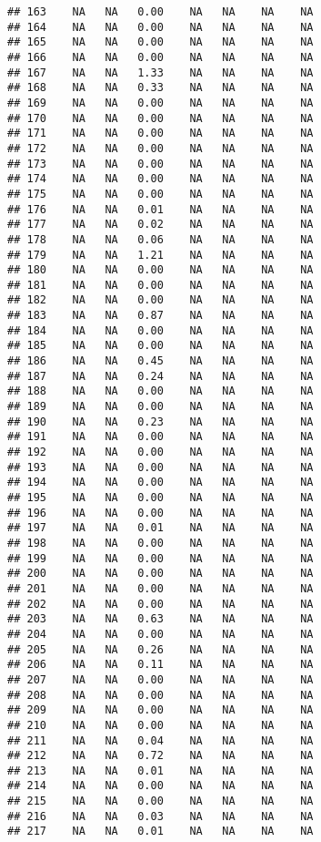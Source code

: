 \documentclass{article}\usepackage{graphicx, color}
\makeatletter
\newenvironment{kframe}{%
 \def\at@end@of@kframe{}%
 \ifinner\ifhmode%
  \def\at@end@of@kframe{\end{minipage}}%
  \begin{minipage}{\columnwidth}%
 \fi\fi%
 \def\FrameCommand##1{\hskip\@totalleftmargin \hskip-\fboxsep
 \colorbox{shadecolor}{##1}\hskip-\fboxsep
     \hskip-\linewidth \hskip-\@totalleftmargin \hskip\columnwidth}%
 \MakeFramed {\advance\hsize-\width
   \@totalleftmargin\z@ \linewidth\hsize
   \@setminipage}}%
 {\par\unskip\endMakeFramed%
 \at@end@of@kframe}
\newenvironment{knitrout}{}{} %
\makeatother
\begin{document}
\begin{knitrout}
\begin{kframe}
\begin{verbatim}
## 163    NA   NA   0.00    NA   NA    NA    NA
## 164    NA   NA   0.00    NA   NA    NA    NA
## 165    NA   NA   0.00    NA   NA    NA    NA
## 166    NA   NA   0.00    NA   NA    NA    NA
## 167    NA   NA   1.33    NA   NA    NA    NA
## 168    NA   NA   0.33    NA   NA    NA    NA
## 169    NA   NA   0.00    NA   NA    NA    NA
## 170    NA   NA   0.00    NA   NA    NA    NA
## 171    NA   NA   0.00    NA   NA    NA    NA
## 172    NA   NA   0.00    NA   NA    NA    NA
## 173    NA   NA   0.00    NA   NA    NA    NA
## 174    NA   NA   0.00    NA   NA    NA    NA
## 175    NA   NA   0.00    NA   NA    NA    NA
## 176    NA   NA   0.01    NA   NA    NA    NA
## 177    NA   NA   0.02    NA   NA    NA    NA
## 178    NA   NA   0.06    NA   NA    NA    NA
## 179    NA   NA   1.21    NA   NA    NA    NA
## 180    NA   NA   0.00    NA   NA    NA    NA
## 181    NA   NA   0.00    NA   NA    NA    NA
## 182    NA   NA   0.00    NA   NA    NA    NA
## 183    NA   NA   0.87    NA   NA    NA    NA
## 184    NA   NA   0.00    NA   NA    NA    NA
## 185    NA   NA   0.00    NA   NA    NA    NA
## 186    NA   NA   0.45    NA   NA    NA    NA
## 187    NA   NA   0.24    NA   NA    NA    NA
## 188    NA   NA   0.00    NA   NA    NA    NA
## 189    NA   NA   0.00    NA   NA    NA    NA
## 190    NA   NA   0.23    NA   NA    NA    NA
## 191    NA   NA   0.00    NA   NA    NA    NA
## 192    NA   NA   0.00    NA   NA    NA    NA
## 193    NA   NA   0.00    NA   NA    NA    NA
## 194    NA   NA   0.00    NA   NA    NA    NA
## 195    NA   NA   0.00    NA   NA    NA    NA
## 196    NA   NA   0.00    NA   NA    NA    NA
## 197    NA   NA   0.01    NA   NA    NA    NA
## 198    NA   NA   0.00    NA   NA    NA    NA
## 199    NA   NA   0.00    NA   NA    NA    NA
## 200    NA   NA   0.00    NA   NA    NA    NA
## 201    NA   NA   0.00    NA   NA    NA    NA
## 202    NA   NA   0.00    NA   NA    NA    NA
## 203    NA   NA   0.63    NA   NA    NA    NA
## 204    NA   NA   0.00    NA   NA    NA    NA
## 205    NA   NA   0.26    NA   NA    NA    NA
## 206    NA   NA   0.11    NA   NA    NA    NA
## 207    NA   NA   0.00    NA   NA    NA    NA
## 208    NA   NA   0.00    NA   NA    NA    NA
## 209    NA   NA   0.00    NA   NA    NA    NA
## 210    NA   NA   0.00    NA   NA    NA    NA
## 211    NA   NA   0.04    NA   NA    NA    NA
## 212    NA   NA   0.72    NA   NA    NA    NA
## 213    NA   NA   0.01    NA   NA    NA    NA
## 214    NA   NA   0.00    NA   NA    NA    NA
## 215    NA   NA   0.00    NA   NA    NA    NA
## 216    NA   NA   0.03    NA   NA    NA    NA
## 217    NA   NA   0.01    NA   NA    NA    NA

\end{verbatim}
\end{kframe}
\end{knitrout}
\end{document}
